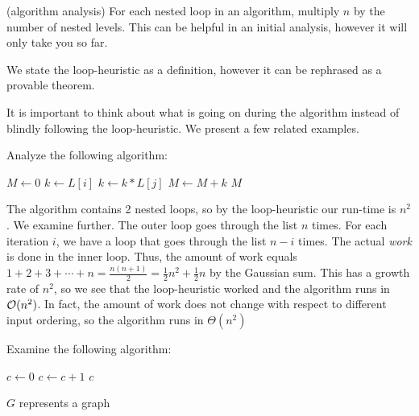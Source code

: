 \documentclass[main.tex]{subfiles}
\begin{document}
\begin{defn}
	(algorithm analysis) For each nested loop in an algorithm, multiply \(n\) by the number of nested levels. This can be helpful in an initial analysis, however it will only take you so far.
\end{defn}

\begin{rem}
	We state the loop-heuristic as a definition, however it can be rephrased as a provable theorem.
\end{rem}

It is important to think about what is going on during the algorithm instead of blindly following the loop-heuristic. We present a few related examples.

\begin{example}
	Analyze the following algorithm:
	\begin{algorithmic}[1]
			\State \(M \gets 0\)
				\State \(k \gets L[i]\)
					\State \(k \gets k * L[j]\)
				\EndFor
				\State \(M \gets M + k\)
			\EndFor
			\State \Return \(M\)
		\EndFunction
	\end{algorithmic}
	
	\begin{sol}
		The algorithm contains 2 nested loops, so by the loop-heuristic our run-time is \(n^2\). We examine further. The outer loop goes through the list \(n\) times. For each iteration \(i\), we have a loop that goes through the list \(n - i\) times. The actual \textit{work} is done in the inner loop. Thus, the amount of work equals \(1 + 2 + 3 + \cdots + n = \frac{n(n+1)}{2} = \frac{1}{2}n^2 + \frac{1}{2}n\) by the Gaussian sum. This has a growth rate of \(n^2\), so we see that the loop-heuristic worked and the algorithm runs in \(\mathcal{O}(n^2)\). In fact, the amount of work does not change with respect to different input ordering, so the algorithm runs in \(\Theta(n^2)\)
	\end{sol}
\end{example}

\begin{example}
	Examine the following algorithm:
	\begin{algorithmic}[1]
			\State \(c \gets 0\)
					\State \(c \gets c + 1\)
				\EndFor
			\EndFor
			\State \Return \(c\)
		\EndFunction
	\end{algorithmic}
	
	\begin{sol}
		\(G\) represents a graph
	\end{sol}
\end{example}
\end{document}
